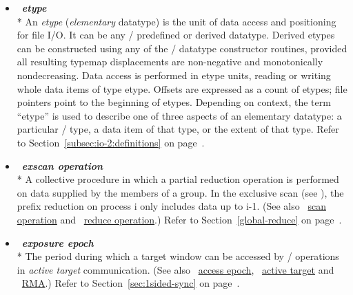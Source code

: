 \begin{itemize}
\label{glossary:etype}
\item  ~\hypertarget{glossary:etype}{\emph{\textbf{etype}}} \\*
An {\it etype} ({\it elementary} datatype)
is the unit of data access and positioning for file I/O.
It can be any \MPI/ predefined or derived datatype.
Derived etypes can be constructed
using any of the \MPI/ datatype constructor routines,
provided all resulting typemap displacements are non-negative
and monotonically nondecreasing.
Data access is performed in etype units,
reading or writing whole data items of type etype.
Offsets are expressed as a count of etypes;
file pointers point to the beginning of etypes.
Depending on context,
the term ``etype'' is used to describe one of three aspects
of an elementary datatype:
a particular \MPI/ type,
a data item of that type,
or the extent of that type.
Refer to Section~\ref{subsec:io-2:definitions} on page~\pageref{subsec:io-2:definitions}.

\label{glossary:exscan_operation}
\item  ~\hypertarget{glossary:exscan_operation}{\emph{\textbf{exscan operation}}} \\*
A collective procedure in which a partial reduction operation is performed on data supplied by the members of a group.
In the exclusive scan (see ), the prefix reduction on process i only includes data up to i-1. 
(See also ~\hyperlink{glossary:scan_operation}{scan operation} and
~\hyperlink{glossary:reduce_operation}{reduce operation}.)
Refer to Section~\ref{global-reduce} on page~\pageref{global-reduce}.

\label {glossary:exposure_epoch}
\item  ~\hypertarget{glossary:exposure_epoch}{\emph{\textbf{exposure epoch}}} \\*
The period during which a target window can be accessed by \RMA/
operations in {\it active target} communication.
(See also ~\hyperlink{glossary:access_epoch}{access epoch},
~\hyperlink{glossary:active_target}{active target}
 and ~\hyperlink{glossary:RMA}{RMA}.)
Refer to Section~\ref{sec:1sided-sync} on page~\pageref{sec:1sided-sync}.


\end{itemize}
